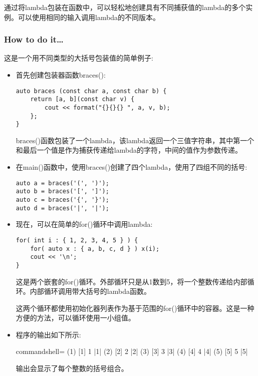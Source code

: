 
通过将lambda包装在函数中，可以轻松地创建具有不同捕获值的lambda的多个实例。可以使用相同的输入调用lambda的不同版本。

\subsubsection{How to do it…}

这是一个用不同类型的大括号包装值的简单例子:

\begin{itemize}
\item 
首先创建包装器函数braces():

\begin{lstlisting}[style=styleCXX]
auto braces (const char a, const char b) {
	return [a, b](const char v) {
		cout << format("{}{}{} ", a, v, b);
	};
}
\end{lstlisting}

braces()函数包装了一个lambda，该lambda返回一个三值字符串，其中第一个和最后一个值是作为捕获传递给lambda的字符，中间的值作为参数传递。

\item 
在main()函数中，使用braces()创建了四个lambda，使用了四组不同的括号:

\begin{lstlisting}[style=styleCXX]
auto a = braces('(', ')');
auto b = braces('[', ']');
auto c = braces('{', '}');
auto d = braces('|', '|');
\end{lstlisting}

\item 
现在，可以在简单的for()循环中调用lambda:

\begin{lstlisting}[style=styleCXX]
for( int i : { 1, 2, 3, 4, 5 } ) {
	for( auto x : { a, b, c, d } ) x(i);
	cout << '\n';
}
\end{lstlisting}

这是两个嵌套的for()循环。外部循环只是从1数到5，将一个整数传递给内部循环。内部循环调用带大括号的lambda函数。

这两个循环都使用初始化器列表作为基于范围的for()循环中的容器。这是一种方便的方法，可以循环使用一小组值。

\item 
程序的输出如下所示:

\begin{tcblisting}{commandshell={}}
(1) [1] {1} |1|
(2) [2] {2} |2|
(3) [3] {3} |3|
(4) [4] {4} |4|
(5) [5] {5} |5|
\end{tcblisting}

输出会显示了每个整数的括号组合。
\end{itemize}

